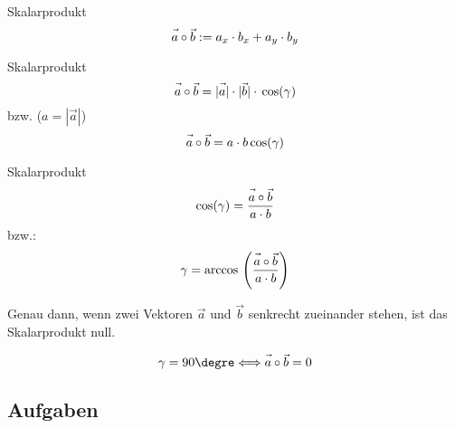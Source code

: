 \begin{definition}{Skalarprodukt}{}
  $$\vec{a\vphantom{b}}\circ\vec{b} := a_x\cdot{}b_x + a_y \cdot{} b_y$$
\end{definition}

\newpage


\begin{gesetz}{Skalarprodukt}{}
  $$\vec{a\vphantom{b}} \circ \vec{b} = |\vec{a\vphantom{b}}| \cdot{} |\vec{b}| \cdot{} \cos(\gamma)$$
bzw. ($a=|\vec{a}|$)
  $$\vec{a\vphantom{b}} \circ \vec{b} = a \cdot{} b \cos(\gamma)$$
\end{gesetz}

\begin{gesetz}{Skalarprodukt}{}
  $$\cos(\gamma) = \frac{\vec{a\vphantom{b}}\circ\vec{b}}{a\cdot b}$$
  bzw.:
  $$\gamma = \arccos{} \left(\frac{\vec{a\vphantom{b}}\circ\vec{b}}{a\cdot b}\right)$$
  
\end{gesetz}

\begin{bemerkung}{}{}
  Genau dann, wenn zwei Vektoren $\vec{a}$ und $\vec{b}$ senkrecht
  zueinander stehen, ist das Skalarprodukt null.

  $$\gamma=90\degre   \Longleftrightarrow  \vec{a\vphantom{b}}\circ\vec{b}=0$$
  \end{bemerkung}


\subsection*{Aufgaben}

\newpage
